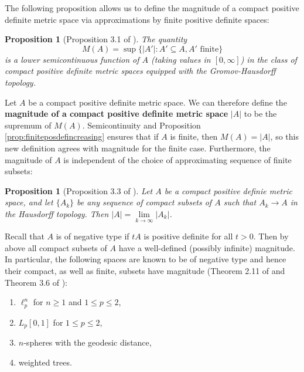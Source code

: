 \documentclass[11pt]{article}
\theoremstyle{mythm}
\newtheorem{prop}[defn]{Proposition}
\begin{document}
The following proposition allows us to define the magnitude of a compact positive definite metric space via approximations by finite positive definite spaces:

\begin{prop}[Proposition 3.1 of \cite{leinster_magnitude_2017}]\label{prop:MAlsc}
The quantity
\begin{equation*}
M(A) = \sup\{\vert A'\vert : A' \subseteq A, \text{$A'$ finite}\}
\end{equation*}
is a lower semicontinuous function of $A$ (taking values in $[0,\infty]$) in the class of compact positive definite metric spaces equipped with the Gromov-Hausdorff topology.
\end{prop}

Let $A$ be a compact positive definite metric space. We can therefore define the \textbf{magnitude of a compact positive definite metric space} $\vert A \vert$ to be the supremum of $M(A)$. Semicontinuity and Proposition \ref{prop:finiteposdefincreasing} ensures that if $A$ is finite, then $M(A) = \vert A \vert$, so this new definition agrees with magnitude for the finite case. Furthermore, the magnitude of $A$ is independent of the choice of approximating sequence of finite subsets:

\begin{prop}[Proposition 3.3 of \cite{leinster_magnitude_2017}]\label{prop:finiteapprox}
Let $A$ be a compact positive definie metric space, and let $\{A_k\}$ be any sequence of compact subsets of $A$ such that $A_k\to A$ in the Hausdorff topology. Then $\vert A \vert = \lim\limits_{k\to\infty}\vert A_k\vert$.
\end{prop}

Recall that $A$ is of negative type if $tA$ is positive definite for all $t > 0$. Then by above all compact subsets of $A$ have a well-defined (possibly infinite) magnitude. In particular, the following spaces are known to be of negative type and hence their compact, as well as finite, subsets have magnitude (Theorem 2.11 of \cite{leinster_magnitude_2017} and Theorem 3.6 of \cite{meckes_positive_2013}):

\begin{enumerate}[label=\arabic*.]
\item $\ell^n_p$ for $n\geq1$ and $1\leq p \leq 2$,
\item $L_p[0,1]$ for $1\leq p \leq 2$,
\item $n$-spheres with the geodesic distance,
\item weighted trees.
\end{enumerate}
\end{document}
